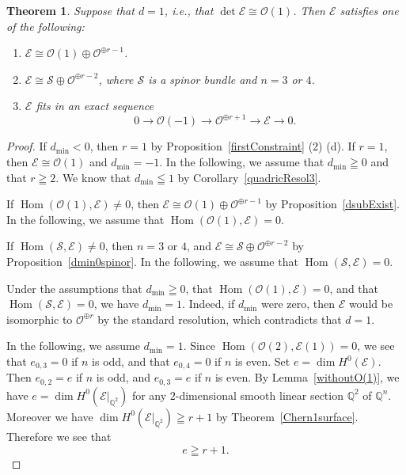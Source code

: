 \documentclass[a4paper,12pt]{amsart}
\newtheorem{thm}{Theorem}[section]
\DeclareMathOperator{\Hom}{Hom}
\begin{document}
\begin{thm}\label{d=1OnHyperquadric}
Suppose that $d=1$, i.e., that $\det\mathcal{E}\cong \mathcal{O}(1)$. 
Then $\mathcal{E}$ satisfies one of the following:
\begin{enumerate}
\item $\mathcal{E}\cong \mathcal{O}(1)\oplus \mathcal{O}^{\oplus r-1}$.
\item $\mathcal{E}\cong \mathcal{S}\oplus \mathcal{O}^{\oplus r-2}$, where 
$\mathcal{S}$ is a spinor bundle and $n=3$ or $4$.
\item $\mathcal{E}$ fits in an exact sequence
\[
0\to \mathcal{O}(-1)\to \mathcal{O}^{\oplus r+1}\to \mathcal{E}\to 0.
\]
\end{enumerate}
\end{thm}
\begin{proof}
If $d_{\min}<0$, then $r=1$ by Proposition~\ref{firstConstraint} (2) (d).
If $r=1$, then $\mathcal{E}\cong \mathcal{O}(1)$ and $d_{\min}=-1$.
In the following, we assume that $d_{\min}\geqq 0$ and that $r\geqq 2$.
We know that $d_{\min}\leqq 1$ by Corollary~\ref{quadricResol3}.

If $\Hom(\mathcal{O}(1),\mathcal{E})\neq 0$, then $\mathcal{E}\cong \mathcal{O}(1)\oplus \mathcal{O}^{\oplus r-1}$
by Proposition~\ref{dsubExist}. In the following, we assume that $\Hom(\mathcal{O}(1),\mathcal{E})= 0$.

If $\Hom(\mathcal{S},\mathcal{E})\neq 0$, then $n=3$ or $4$,
and $\mathcal{E}\cong \mathcal{S}\oplus \mathcal{O}^{\oplus r-2}$
by Proposition~\ref{dmin0spinor}.
In the following, we assume that $\Hom(\mathcal{S},\mathcal{E})= 0$.

Under the assumptions that $d_{\min}\geqq 0$, that $\Hom(\mathcal{O}(1),\mathcal{E})= 0$, and that 
$\Hom(\mathcal{S},\mathcal{E})= 0$, we have $d_{\min}=1$.
Indeed, if $d_{\min}$ were zero, then 
$\mathcal{E}$ would be isomorphic to $\mathcal{O}^{\oplus r}$ by 
the standard resolution,
which contradicts that $d=1$.

In the following, we assume $d_{\min}=1$.
Since $\Hom(\mathcal{O}(2),\mathcal{E}(1))= 0$, we see that $e_{0,3}=0$ if $n$ is odd,
and that $e_{0,4}=0$ if $n$ is even.
Set $e=\dim H^0(\mathcal{E})$. Then $e_{0,2}=e$ if $n$ is odd,
and $e_{0,3}=e$ if $n$ is even.
By Lemma~\ref{withoutO(1)}, we have $e=\dim H^0(\mathcal{E}|_{\mathbb{Q}^2})$
for any $2$-dimensional smooth linear section $\mathbb{Q}^2$
of $\mathbb{Q}^n$.
Moreover we have $\dim H^0(\mathcal{E}|_{\mathbb{Q}^2})\geqq r+1$ 
by Theorem~\ref{Chern1surface}.
Therefore we see that 
\[e\geqq r+1.\]


\end{proof}
\end{document}
